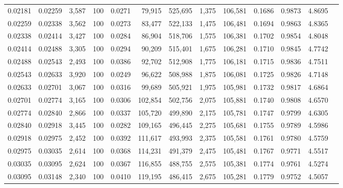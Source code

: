 \begin{tabular}{rrrrrrrrrrrrr}
0.02181 & 0.02259 & 3,587 & 100 &                                     0.0271 &  79,915 & 525,695 &   1,375 & 106,581 & 0.1686 & 0.9873 & 4.8695 \\
0.02259 & 0.02338 & 3,562 & 100 &                                     0.0273 &  83,477 & 522,133 &   1,475 & 106,481 & 0.1694 & 0.9863 & 4.8365 \\
0.02338 & 0.02414 & 3,427 & 100 &                                     0.0284 &  86,904 & 518,706 &   1,575 & 106,381 & 0.1702 & 0.9854 & 4.8048 \\
0.02414 & 0.02488 & 3,305 & 100 &                                     0.0294 &  90,209 & 515,401 &   1,675 & 106,281 & 0.1710 & 0.9845 & 4.7742 \\
0.02488 & 0.02543 & 2,493 & 100 &                                     0.0386 &  92,702 & 512,908 &   1,775 & 106,181 & 0.1715 & 0.9836 & 4.7511 \\
0.02543 & 0.02633 & 3,920 & 100 &                                     0.0249 &  96,622 & 508,988 &   1,875 & 106,081 & 0.1725 & 0.9826 & 4.7148 \\
0.02633 & 0.02701 & 3,067 & 100 &                                     0.0316 &  99,689 & 505,921 &   1,975 & 105,981 & 0.1732 & 0.9817 & 4.6864 \\
0.02701 & 0.02774 & 3,165 & 100 &                                     0.0306 & 102,854 & 502,756 &   2,075 & 105,881 & 0.1740 & 0.9808 & 4.6570 \\
0.02774 & 0.02840 & 2,866 & 100 &                                     0.0337 & 105,720 & 499,890 &   2,175 & 105,781 & 0.1747 & 0.9799 & 4.6305 \\
0.02840 & 0.02918 & 3,445 & 100 &                                     0.0282 & 109,165 & 496,445 &   2,275 & 105,681 & 0.1755 & 0.9789 & 4.5986 \\
0.02918 & 0.02975 & 2,452 & 100 &                                     0.0392 & 111,617 & 493,993 &   2,375 & 105,581 & 0.1761 & 0.9780 & 4.5759 \\
0.02975 & 0.03035 & 2,614 & 100 &                                     0.0368 & 114,231 & 491,379 &   2,475 & 105,481 & 0.1767 & 0.9771 & 4.5517 \\
0.03035 & 0.03095 & 2,624 & 100 &                                     0.0367 & 116,855 & 488,755 &   2,575 & 105,381 & 0.1774 & 0.9761 & 4.5274 \\
0.03095 & 0.03148 & 2,340 & 100 &                                     0.0410 & 119,195 & 486,415 &   2,675 & 105,281 & 0.1779 & 0.9752 & 4.5057 \\

\end{tabular}
